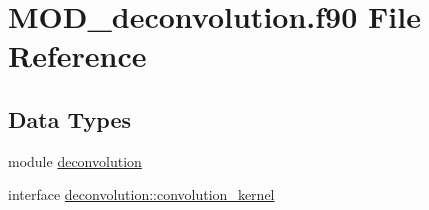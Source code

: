 \hypertarget{MOD__deconvolution_8f90}{\section{M\-O\-D\-\_\-deconvolution.\-f90 File Reference}
\label{MOD__deconvolution_8f90}
}
\subsection*{Data Types}
\begin{DoxyCompactItemize}
\item 
module \hyperlink{classdeconvolution}{deconvolution}
\item 
interface \hyperlink{interfacedeconvolution_1_1convolution__kernel}{deconvolution\-::convolution\-\_\-kernel}
\end{DoxyCompactItemize}
